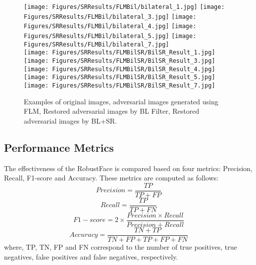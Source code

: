 \documentclass[sn-mathphys]{sn-jnl}%
\theoremstyle{thmstyleone}%
\theoremstyle{thmstyletwo}%
\theoremstyle{thmstylethree}%
\begin{document}
\begin{figure*}
\texttt{[image: Figures/SRResults/FLMBil/bilateral\_1.jpg]}
\texttt{[image: Figures/SRResults/FLMBil/bilateral\_3.jpg]}
\texttt{[image: Figures/SRResults/FLMBil/bilateral\_4.jpg]}
\texttt{[image: Figures/SRResults/FLMBil/bilateral\_5.jpg]}
\texttt{[image: Figures/SRResults/FLMBil/bilateral\_7.jpg]}\\
\texttt{[image: Figures/SRResults/FLMBilSR/BilSR\_Result\_1.jpg]}
\texttt{[image: Figures/SRResults/FLMBilSR/BilSR\_Result\_3.jpg]}
\texttt{[image: Figures/SRResults/FLMBilSR/BilSR\_Result\_4.jpg]}
\texttt{[image: Figures/SRResults/FLMBilSR/BilSR\_Result\_5.jpg]}
\texttt{[image: Figures/SRResults/FLMBilSR/BilSR\_Result\_7.jpg]}\\

\caption{Examples of original images, adversarial images generated using FLM, Restored adversarial images by BL Filter, Restored adversarial images by BL+SR.}
\label{flmresults}
\end{figure*}

\subsection{Performance Metrics}
The effectiveness of the RobustFace is compared based on four metrics: Precision, Recall, F1-score and Accuracy. These metrics are computed as follows:
\begin{equation}
    Precision = \frac{TP}{TP+FP}
\end{equation}
\begin{equation}
  Recall = \frac{TP}{TP+FN}
\end{equation}
\begin{equation}
    F1-score = 2 \times \frac{Precision \times Recall}{Precision+Recall}
\end{equation}
\begin{equation}
    Accuracy = \frac{TN+TP}{TN+FP+TP+FP+FN}
\end{equation}
where, TP, TN, FP and FN correspond to the number of true positives, true negatives, false positives and false negatives, respectively.
\end{document}
